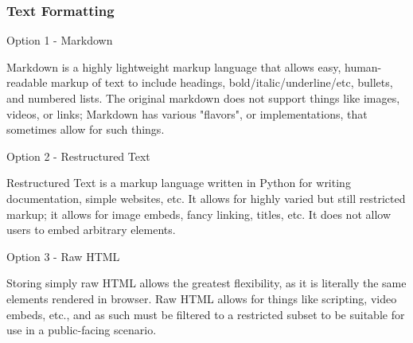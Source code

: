 \documentclass[letterpaper, 10pt, draftclsnofoot, compsoc, onecolumn]{IEEEtran}
\begin{document}
{\subsubsection{Text Formatting}
{\noindent \par}
{\noindent Option 1 - Markdown \par}
{\noindent Markdown is a highly lightweight markup language that allows easy, human-readable markup
of text to include headings, bold/italic/underline/etc, bullets, and numbered lists. The original markdown does not support
things like images, videos, or links; Markdown has various "flavors", or implementations, that sometimes
allow for such things. \par}
{\noindent Option 2 - Restructured Text \par}
{\noindent Restructured Text is a markup language written in Python for writing documentation, simple websites,
etc. It allows for highly varied but still restricted markup; it allows for image embeds, fancy linking,
titles, etc. It does not allow users to embed arbitrary elements. \par}
{\noindent Option 3 - Raw HTML \par}
{\noindent Storing simply raw HTML allows the greatest flexibility, as it is literally the same elements
rendered in browser. Raw HTML allows for things like scripting, video embeds, etc., and as such must
be filtered to a restricted subset to be suitable for use in a public-facing scenario. \par}

\medskip
}
\end{document}
